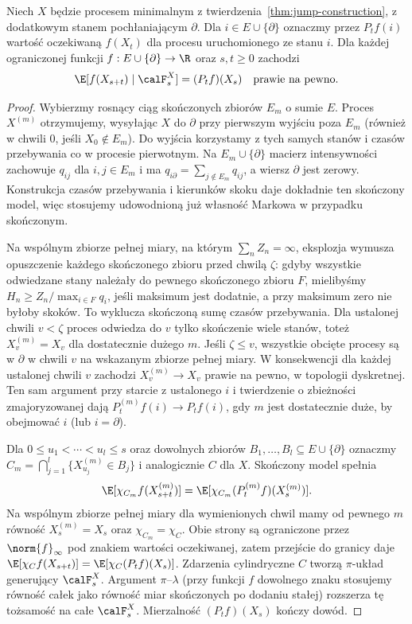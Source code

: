 \begin{twierdzenie}
Niech $X$ będzie procesem minimalnym z
twierdzenia~\ref{thm:jump-construction}, z dodatkowym
stanem pochłaniającym $\partial$. Dla $i\in E\cup\{\partial\}$
oznaczmy przez $P_t f(i)$ wartość oczekiwaną $f(X_t)$
dla procesu uruchomionego ze stanu $i$.
Dla każdej ograniczonej funkcji $f:E\cup\{\partial\}\to\R$
oraz $s,t\ge0$ zachodzi
\[
\E[f(X_{s+t})\mid\calF_s^X]=(P_t f)(X_s)
\quad\text{prawie na pewno}.
\]
\end{twierdzenie}
\begin{proof}
Wybierzmy rosnący ciąg skończonych zbiorów $E_m$
o sumie $E$. Proces $X^{(m)}$ otrzymujemy, wysyłając
$X$ do $\partial$ przy pierwszym wyjściu poza $E_m$
(również w chwili $0$, jeśli $X_0\notin E_m$).
Do wyjścia korzystamy z tych samych stanów i czasów
przebywania co w procesie pierwotnym.
Na $E_m\cup\{\partial\}$ macierz intensywności zachowuje
$q_{ij}$ dla $i,j\in E_m$ i ma
$q_{i\partial}=\sum_{j\notin E_m}q_{ij}$,
a wiersz $\partial$ jest zerowy. Konstrukcja czasów
przebywania i kierunków skoku daje dokładnie ten
skończony model, więc stosujemy udowodnioną już
własność Markowa w przypadku skończonym.

Na wspólnym zbiorze pełnej miary, na którym
$\sum_n Z_n=\infty$, eksplozja wymusza opuszczenie
każdego skończonego zbioru przed chwilą $\zeta$:
gdyby wszystkie odwiedzane stany należały do
pewnego skończonego zbioru $F$, mielibyśmy
$H_n\ge Z_n/\max_{i\in F}q_i$, jeśli maksimum jest
dodatnie, a przy maksimum zero nie byłoby skoków.
To wyklucza skończoną sumę czasów przebywania.
Dla ustalonej chwili $v<\zeta$ proces odwiedza
do $v$ tylko skończenie wiele stanów, toteż
$X_v^{(m)}=X_v$ dla dostatecznie dużego $m$.
Jeśli $\zeta\le v$, wszystkie obcięte procesy
są w $\partial$ w chwili $v$ na wskazanym zbiorze
pełnej miary. W konsekwencji dla każdej ustalonej
chwili $v$ zachodzi $X_v^{(m)}\to X_v$ prawie na pewno,
w topologii dyskretnej. Ten sam argument przy
starcie z ustalonego $i$ i twierdzenie o zbieżności
zmajoryzowanej dają $P_t^{(m)}f(i)\to P_t f(i)$,
gdy $m$ jest dostatecznie duże, by obejmować $i$
(lub $i=\partial$).

Dla $0\le u_1<\cdots<u_l\le s$ oraz dowolnych
zbiorów $B_1,\ldots,B_l\subseteq E\cup\{\partial\}$
oznaczmy $C_m=\bigcap_{j=1}^l\{X_{u_j}^{(m)}\in B_j\}$
i analogicznie $C$ dla $X$.
Skończony model spełnia
\[
\E[\chi_{C_m} f(X_{s+t}^{(m)})]
=\E[\chi_{C_m}(P_t^{(m)}f)(X_s^{(m)})].
\]
Na wspólnym zbiorze pełnej miary dla wymienionych
chwil mamy od pewnego $m$ równość $X_s^{(m)}=X_s$
oraz $\chi_{C_m}=\chi_C$. Obie strony są ograniczone
przez $\norm{f}_\infty$ pod znakiem wartości oczekiwanej,
zatem przejście do granicy daje
$\E[\chi_C f(X_{s+t})]=\E[\chi_C(P_tf)(X_s)]$.
Zdarzenia cylindryczne $C$ tworzą $\pi$-układ
generujący $\calF_s^X$. Argument $\pi$--$\lambda$
(przy funkcji $f$ dowolnego znaku stosujemy równość
całek jako równość miar skończonych po dodaniu stałej)
rozszerza tę tożsamość na całe $\calF_s^X$.
Mierzalność $(P_tf)(X_s)$ kończy dowód.
\end{proof}


